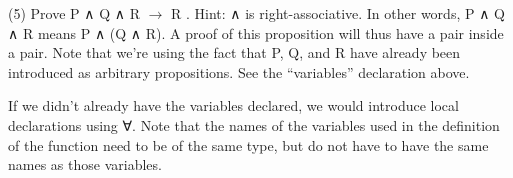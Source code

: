 \documentclass[letterpaper,10pt,english]{sphinxmanual}
\begin{document}
\begin{sphinxVerbatim}[commandchars=\\\{\}]
        
\end{sphinxVerbatim}

(5) Prove P ∧ Q ∧ R \(\rightarrow\) R . Hint: ∧ is right-associative.  In other
words, P ∧ Q ∧ R means P ∧ (Q ∧ R). A proof of this proposition will
thus have a pair inside a pair.  Note that we’re using the fact that
P, Q, and R have already been introduced as arbitrary
propositions. See the “variables” declaration above.

\begin{sphinxVerbatim}[commandchars=\\\{\}]
         
           
\end{sphinxVerbatim}

If we didn’t already have the variables declared, we would introduce
local declarations using ∀. Note that the names of the variables used
in the definition of the function need to be of the same type, but do
not have to have the same names as those variables.

\begin{sphinxVerbatim}[commandchars=\\\{\}]
              
         
\end{sphinxVerbatim}
\end{document}
